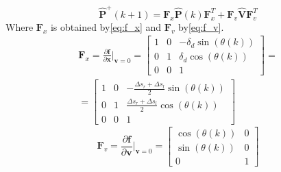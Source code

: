 \begin{equation}
    \label{eq:prediction_update_covariance}
    \hat{\mathbf{P}}^+(k+1) = \mathbf{F}_x \hat{\mathbf{P}}(k) \mathbf{F}_x^T + \mathbf{F}_v \hat{\mathbf{V}} \mathbf{F}_v^T
\end{equation}
Where $\mathbf{F}_x$ is obtained by\:\eqref{eq:f_x} and $\mathbf{F}_v$ by\:\eqref{eq:f_v}\:\cite{corke_robotics_2023}.
\begin{equation}
    \label{eq:f_x}
    \begin{split}
        \mathbf{F}_x = \frac{\partial \mathbf{f}}{\partial \mathbf{x}} \bigg\rvert_{\mathbf{v} = 0} =
        \begin{bmatrix}
            1 & 0 & -\delta_d \sin{(\theta (k))} \\
            0 & 1 & \delta_d \cos{(\theta (k))} \\
            0 & 0 & 1
        \end{bmatrix}
        = \\
        =
        \begin{bmatrix}
            1 & 0 & -\frac{\Delta s_r + \Delta s_l}{2} \sin{(\theta (k))}\\ 
            0 & 1 & \frac{\Delta s_r + \Delta s_l}{2} \cos{(\theta (k))}\\
            0 & 0 & 1
        \end{bmatrix}
    \end{split}
\end{equation}
\begin{equation}
    \label{eq:f_v}
    \mathbf{F}_v = \frac{\partial \mathbf{f}}{\partial \mathbf{v}} \bigg\rvert_{\mathbf{v} = 0} = 
    \begin{bmatrix}
        \cos{(\theta (k))} & 0 \\
        \sin{(\theta (k))} & 0 \\
        0 & 1
    \end{bmatrix}
\end{equation}


